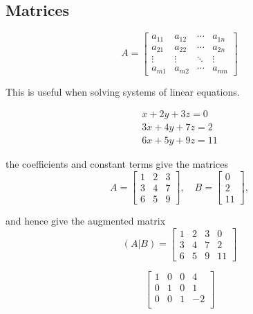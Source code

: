 

\subsection{Matrices}
\[
 A =
 \begin{bmatrix}
 a_{11} & a_{12} & \cdots & a_{1n} \\
 a_{21} & a_{22} & \cdots & a_{2n} \\
 \vdots & \vdots & \ddots & \vdots \\
 a_{m1} & a_{m2} & \cdots & a_{mn}
 \end{bmatrix}\]
 
This is useful when solving systems of linear equations.


\begin{eqnarray} \nonumber
x + 2y + 3z = 0 \\ \nonumber
3x + 4y + 7z = 2 \\ \nonumber
6x + 5y + 9z = 11 \nonumber
\end{eqnarray}

the coefficients and constant terms give the matrices
\[
A =
\begin{bmatrix}
1 & 2 & 3 \\
3 & 4 & 7 \\
6 & 5 & 9
\end{bmatrix}
, \quad
B =
\begin{bmatrix}
0 \\
2 \\
11
\end{bmatrix},
\]

and hence give the augmented matrix
\[
(A|B) =
  \left[\begin{array}{ccc|c}
1 & 2 & 3 & 0 \\
3 & 4 & 7 & 2 \\
6 & 5 & 9 & 11
  \end{array}\right]
\]

\[\left[\begin{array}{ccc|c}
1 & 0 & 0 & 4 \\
0 & 1 & 0 & 1 \\
0 & 0 & 1 & -2 \\
  \end{array}\right]\]
